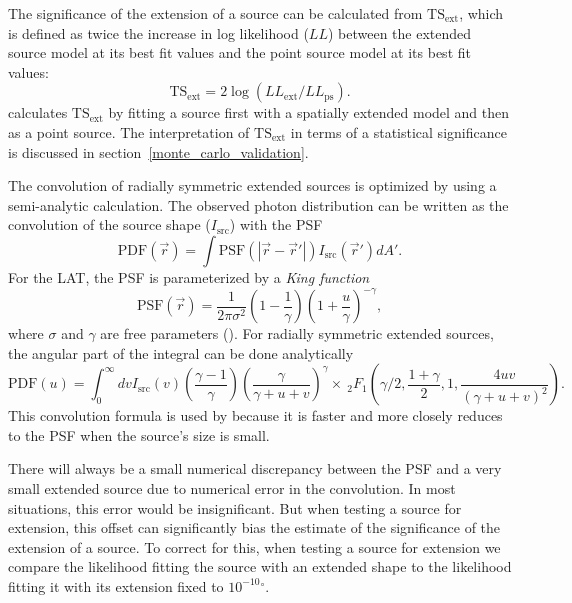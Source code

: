 \documentclass[12pt,preprint]{aastex}
\newcommand{\tsext}{{\ensuremath{\text{TS}_{\text{ext}}}}\xspace}
\newcommand{\loglikelihood}{\ensuremath{LL}\xspace}
\renewcommand{\deg}{\ensuremath{^\circ}\xspace}
\newcommand{\pointlike}{\text{\em pointlike}\xspace}
\begin{document}
The significance of the extension of a source can be calculated from
\tsext, which is defined as twice the increase in log likelihood (\loglikelihood)
between
the extended source model at its best fit values and the point source
model at its best fit values:
\begin{equation}
  \tsext=2\log(\loglikelihood_\text{ext}/\loglikelihood_\text{ps}).
\end{equation}
\pointlike calculates \tsext by fitting a source first with a spatially
extended model and then as a point source.  The interpretation
of \tsext in terms of a statistical significance is discussed in
section~\ref{monte_carlo_validation}.

The convolution of radially symmetric extended sources is optimized by
using a semi-analytic calculation.  The observed photon distribution
can be written as the convolution of the source shape ($I_\text{src}$)
with the PSF
\begin{equation}
  \text{PDF}(\vec r) = \int  \text{PSF}(|\vec r - \vec r'|)I_\text{src}(\vec r') d A'.
\end{equation}
For the LAT, the PSF is parameterized by a {\em King function}
\begin{equation}
  \text{PSF}(\vec r) = 
  \frac{1}{2\pi\sigma^2}
  \left(1-\frac{1}{\gamma}\right)
  \left(1+\frac{u}{\gamma}\right)^{-\gamma},
\end{equation}
where $\sigma$ and $\gamma$ are free parameters
(\cite{matthew_kerr_thesis}).  For radially symmetric extended sources,
the angular part of the integral can be done analytically
\begin{equation}
  \text{PDF}(u)= \int_0^\infty dv
  I_\text{src}(v) 
  \left(\frac{\gamma-1}{\gamma}\right)
  \left( \frac{\gamma}{\gamma + u + v}\right)^\gamma 
  \times ~_2F_1 \left(\gamma/2,\frac{1+\gamma}{2},1,\frac{4uv}{(\gamma+u+v)^2}\right).
\end{equation}
This convolution formula is used by \pointlike because it is faster
and more closely reduces to the PSF when the source's size is 
small.

There will always be a small numerical discrepancy between the PSF and
a very small extended source due to numerical error in the convolution.
In most situations, this error would be insignificant. But when testing
a source for extension, this offset can significantly bias the estimate
of the significance of the extension of a source.  To correct for this,
when testing a source for extension we compare the likelihood fitting
the source with an extended shape to the likelihood fitting it with its
extension fixed to ${10^{-10}}\deg$.
\end{document}

